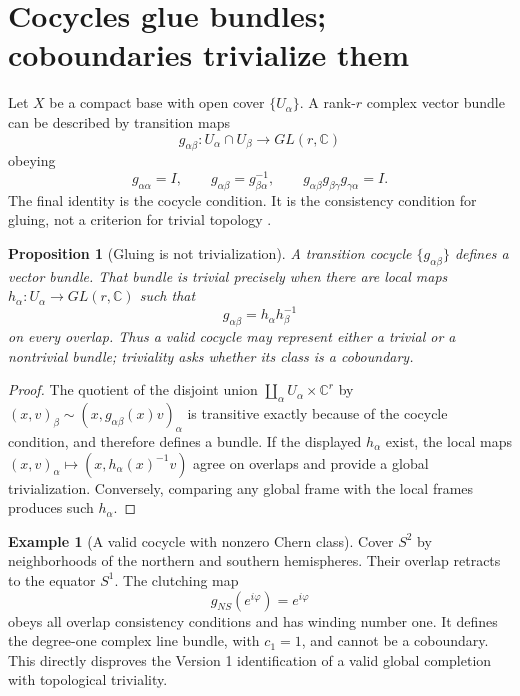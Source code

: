 \documentclass[11pt]{article}
\newtheorem{proposition}[theorem]{Proposition}
\theoremstyle{definition}
\newtheorem{example}[theorem]{Example}
\theoremstyle{remark}
\newcommand{\C}{\mathbb{C}}
\begin{document}
\section{Cocycles glue bundles; coboundaries trivialize them}
\label{sec:cocycle}

Let \(X\) be a compact base with open cover \(\{U_\alpha\}\).  A rank-\(r\)
complex vector bundle can be described by transition maps
\[
 g_{\alpha\beta}:U_\alpha\cap U_\beta\longrightarrow GL(r,\C)
\]
obeying
\[
 g_{\alpha\alpha}=I,\qquad
 g_{\alpha\beta}=g_{\beta\alpha}^{-1},\qquad
 g_{\alpha\beta}g_{\beta\gamma}g_{\gamma\alpha}=I.
\]
The final identity is the cocycle condition.  It is the consistency
condition for gluing, not a criterion for trivial topology
\cite{Hatcher2003}.

\begin{proposition}[Gluing is not trivialization]
\label{prop:cocycle}
A transition cocycle \(\{g_{\alpha\beta}\}\) defines a vector bundle.
That bundle is trivial precisely when there are local maps
\(h_\alpha:U_\alpha\to GL(r,\C)\) such that
\[
 g_{\alpha\beta}=h_\alpha h_\beta^{-1}
\]
on every overlap.  Thus a valid cocycle may represent either a trivial or a
nontrivial bundle; triviality asks whether its class is a coboundary.
\end{proposition}

\begin{proof}
The quotient of the disjoint union
\(\coprod_\alpha U_\alpha\times\C^r\) by
\((x,v)_\beta\sim(x,g_{\alpha\beta}(x)v)_\alpha\) is transitive exactly
because of the cocycle condition, and therefore defines a bundle.  If the
displayed \(h_\alpha\) exist, the local maps
\((x,v)_\alpha\mapsto(x,h_\alpha(x)^{-1}v)\) agree on overlaps and provide a
global trivialization.  Conversely, comparing any global frame with the
local frames produces such \(h_\alpha\).
\end{proof}

\begin{example}[A valid cocycle with nonzero Chern class]
\label{ex:clutching}
Cover \(S^2\) by neighborhoods of the northern and southern hemispheres.
Their overlap retracts to the equator \(S^1\).  The clutching map
\[
 g_{NS}(e^{i\varphi})=e^{i\varphi}
\]
obeys all overlap consistency conditions and has winding number one.  It
defines the degree-one complex line bundle, with
\(c_1=1\), and cannot be a coboundary.  This directly disproves the
Version 1 identification of a valid global completion with topological
triviality.
\end{example}
\end{document}
